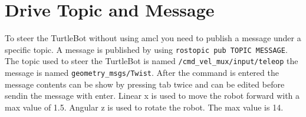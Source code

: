 \section{Drive Topic and Message}
To steer the TurtleBot without using amcl you need to publish a message under a specific topic. A message is published by using \verb#rostopic pub TOPIC MESSAGE#.
The topic used to steer the TurtleBot is named \verb#/cmd_vel_mux/input/teleop# the message is named \verb#geometry_msgs/Twist#. After the command is entered the message contents can be show by pressing tab twice and can be edited before sendin the message with enter. Linear x is used to move the robot forward with a max value of 1.5. Angular z is used to rotate the robot. The max value is 14.
